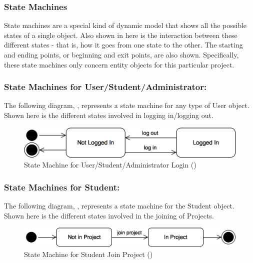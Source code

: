 \documentclass[12pt,letterpaper]{article}
\begin{document}
\subsubsection*{State Machines}

State machines are a special kind of dynamic model that shows all the possible states of a single object. Also shown in here is the interaction between these 
different states - that is, how it goes from one state to the other. The starting and ending points, or beginning and exit points, are also shown. Specifically, these state
machines only concern entity objects for this particular project.

\subsubsection*{State Machines for User/Student/Administrator:}

The following diagram, , represents a state machine for any type of User object. Shown here is the different states involved in logging in/logging out.

\begin{figure}[H]
	\centering{}
	\includegraphics[scale=0.3]{imgs/state/user-log-in.png}
	\caption[ - State Machine for User/Student/Administrator Login]{State Machine for User/Student/Administrator Login ()}
\end{figure}

\subsubsection*{State Machines for Student:}

The following diagram, , represents a state machine for the Student object. Shown here is the different states involved in the joining of Projects.

\begin{figure}[H]
	\centering{}
	\includegraphics[scale=0.3]{imgs/state/student-join-project.png}
	\caption[ - State Machine for Student Join Project]{State Machine for Student Join Project ()}
\end{figure}
\end{document}
